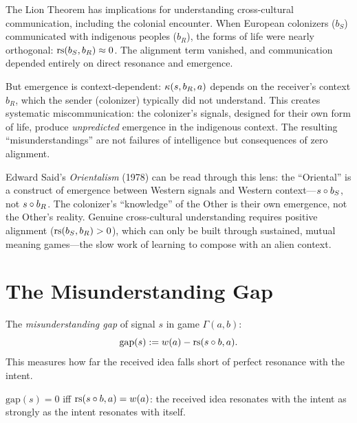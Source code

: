 \begin{remark}
The Lion Theorem has implications for understanding cross-cultural
communication, including the colonial encounter. When European colonizers
($b_S$) communicated with indigenous peoples ($b_R$), the forms of life
were nearly orthogonal: $\mathrm{rs}(b_S, b_R) \approx 0$. The alignment
term vanished, and communication depended entirely on direct resonance
and emergence.

But emergence is context-dependent: $\kappa(s, b_R, a)$ depends on
the receiver's context $b_R$, which the sender (colonizer) typically
did not understand. This creates systematic miscommunication: the
colonizer's signals, designed for their own form of life, produce
\emph{unpredicted} emergence in the indigenous context. The resulting
``misunderstandings'' are not failures of intelligence but consequences
of zero alignment.

Edward Said's \emph{Orientalism} (1978) can be read through this lens:
the ``Oriental'' is a construct of emergence between Western signals
and Western context---$s \circ b_S$, not $s \circ b_R$. The
colonizer's ``knowledge'' of the Other is their own emergence, not the
Other's reality. Genuine cross-cultural understanding requires positive
alignment ($\mathrm{rs}(b_S, b_R) > 0$), which can only be built through
sustained, mutual meaning games---the slow work of learning to compose
with an alien context.
\end{remark}


\section{The Misunderstanding Gap}

\begin{definition}
\label{def:misunderstanding}
The \emph{misunderstanding gap} of signal $s$ in game $\Gamma(a, b)$:
\[
\mathrm{gap}(s) := w(a) - \mathrm{rs}(s \circ b, a).
\]
This measures how far the received idea falls short of perfect resonance
with the intent.
\end{definition}

\begin{proposition}
\label{prop:perfect-comm}
$\mathrm{gap}(s) = 0$ iff $\mathrm{rs}(s \circ b, a) = w(a)$: the received idea
resonates with the intent as strongly as the intent resonates with itself.
\end{proposition}

